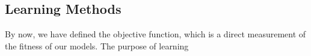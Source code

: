 \subsection {Learning Methods}
By now, we have defined the objective function, which is a direct measurement of the fitness of our models. The purpose of learning